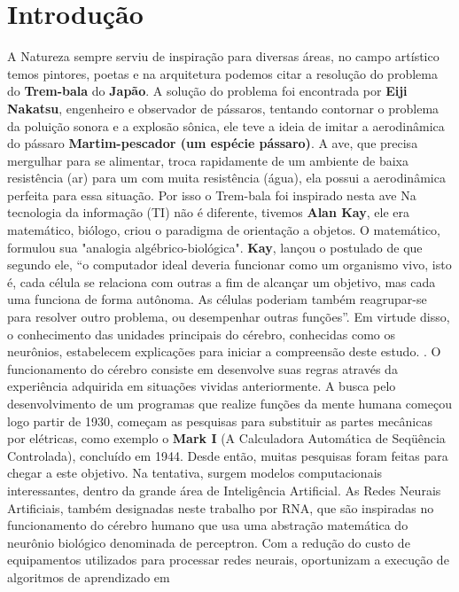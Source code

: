 \section{Introdução}\label{sec:intro}
A Natureza sempre serviu de inspiração para diversas áreas, no campo artístico temos pintores, poetas e na arquitetura podemos citar a resolução do problema do \textbf{Trem-bala} do \textbf{Japão}. A solução do problema foi encontrada por \textbf{Eiji Nakatsu}, engenheiro e observador de pássaros, tentando contornar o problema da poluição sonora e a explosão sônica, ele teve a ideia de  imitar a aerodinâmica do pássaro \textbf{Martim-pescador (um espécie pássaro)}.  A ave, que precisa mergulhar para se alimentar, troca rapidamente de um ambiente de baixa resistência (ar) para um com muita resistência (água), ela possui a aerodinâmica perfeita para essa situação. Por isso o Trem-bala foi inspirado nesta ave\cite{area_engenaria} Na tecnologia da informação (TI) não é diferente, tivemos \textbf{Alan Kay}, ele era matemático, biólogo, criou o paradigma de orientação a objetos.  O matemático, formulou sua "analogia algébrico-biológica". \textbf{Kay}, lançou o postulado de que segundo ele, “o computador ideal deveria funcionar como um organismo vivo, isto é, cada célula se relaciona com outras a fim de alcançar um objetivo, mas cada uma funciona de forma autônoma. As células poderiam também reagrupar-se para resolver outro problema, ou desempenhar outras funções”.\cite{Alan_Kay}
Em virtude disso, o conhecimento das unidades principais do cérebro, conhecidas como os neurônios, estabelecem explicações para iniciar a compreensão deste estudo.
\cite{Neuronio}.
  O funcionamento do cérebro consiste em desenvolve suas regras através da experiência adquirida em situações vividas anteriormente\cite{Neuronio}.
A busca pelo desenvolvimento de um programas que realize funções da mente humana
começou logo  partir de 1930, começam as pesquisas para substituir as partes mecânicas por elétricas, como exemplo o \textbf{Mark I} (A Calculadora Automática de Seqüência Controlada), concluído em 1944\cite{uff}. Desde então, muitas pesquisas foram
feitas para chegar a este objetivo. Na tentativa, surgem modelos computacionais interessantes, dentro da grande área de Inteligência Artificial.
As Redes Neurais Artificiais, também designadas neste trabalho por RNA, que são inspiradas no funcionamento do cérebro humano que usa uma abstração matemática do neurônio biológico denominada de perceptron.\cite{MCCULLOCH}
Com a redução do custo de equipamentos utilizados
para processar redes neurais, oportunizam a execução de algoritmos de aprendizado em
